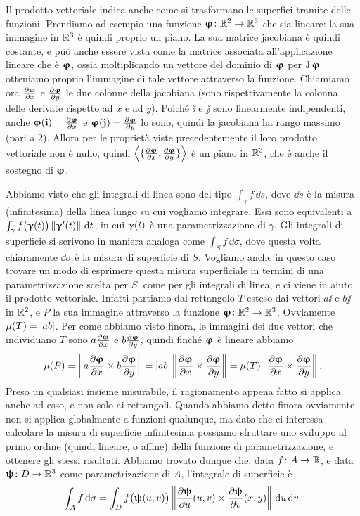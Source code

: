 Il prodotto vettoriale indica anche come si trasformano le superfici tramite delle funzioni.
Prendiamo ad esempio una funzione $\bm{\upvarphi}\colon\mathbb{R}^2\to\mathbb{R}^3$ che sia lineare: la sua immagine in $\mathbb{R}^3$ è quindi proprio un piano.
La sua matrice jacobiana è quindi costante, e può anche essere vista come la matrice associata all'applicazione lineare che è $\bm{\upvarphi}$, ossia moltiplicando un vettore del dominio di $\bm{\upvarphi}$ per $\operatorname{J}{\bm{\upvarphi}}$ otteniamo proprio l'immagine di tale vettore attraverso la funzione.
Chiamiamo ora $\frac{\partial {\bm{\upvarphi}}}{\partial {x}}$ e $\frac{\partial {\bm{\upvarphi}}}{\partial {y}}$ le due colonne della jacobiana (sono rispettivamente la colonna delle derivate rispetto ad $x$ e ad $y$).
Poich\'e $\ii$ e $\jj$ sono linearmente indipendenti, anche $\vphi(\ii)=\drp{\vphi}{x}$ e $\vphi(\jj)=\drp{\vphi}{y}$ lo sono, quindi la jacobiana ha rango massimo (pari a 2).
Allora per le proprietà viste precedentemente il loro prodotto vettoriale non è nullo, quindi $\left\langle{\{\frac{\partial {\bm{\upvarphi}}}{\partial {x}},\frac{\partial {\bm{\upvarphi}}}{\partial {y}}\}}\right\rangle$ è un piano in $\mathbb{R}^3$, che è anche il sostegno di $\bm{\upvarphi}$.

Abbiamo visto che gli integrali di linea sono del tipo $\int_\gamma f\,\dd s$, dove $\dd s$ è la misura (infinitesima) della linea lungo su cui vogliamo integrare.
Essi sono equivalenti a $\int_\gamma f\big(\bm{\upgamma}(t)\big)\left\|{\bm{\upgamma}'(t)}\right\|\,\textup{d} t$, in cui $\bm{\upgamma}(t)$ è una parametrizzazione di $\gamma$.
Gli integrali di superficie si scrivono in maniera analoga come $\int_S f\,\dd\sigma$, dove questa volta chiaramente $\dd\sigma$ è la misura di superficie di $S$.
Vogliamo anche in questo caso trovare un modo di esprimere questa misura superficiale in termini di una parametrizzazione scelta per $S$, come per gli integrali di linea, e ci viene in aiuto il prodotto vettoriale.
Infatti partiamo dal rettangolo $T$ esteso dai vettori $a\ii$ e $b\jj$ in $\mathbb{R}^2$, e $P$ la sua immagine attraverso la funzione $\bm{\upvarphi}\colon\mathbb{R}^2\to\mathbb{R}^3$.
Ovviamente $\mu(T)=\left|{ab}\right|$.
Per come abbiamo visto finora, le immagini dei due vettori che individuano $T$ sono $a\frac{\partial {\bm{\upvarphi}}}{\partial {x}}$ e $b\frac{\partial {\bm{\upvarphi}}}{\partial {y}}$, quindi finch\'e $\bm{\upvarphi}$ è lineare abbiamo
\begin{equation*}
	\mu(P)=\left\|{a\frac{\partial {\bm{\upvarphi}}}{\partial {x}}\times b\frac{\partial {\bm{\upvarphi}}}{\partial {y}}}\right\|=\left|{ab}\right|\left\|{\frac{\partial {\bm{\upvarphi}}}{\partial {x}}\times\frac{\partial {\bm{\upvarphi}}}{\partial {y}}}\right\|=\mu(T)\left\|{\frac{\partial {\bm{\upvarphi}}}{\partial {x}}\times\frac{\partial {\bm{\upvarphi}}}{\partial {y}}}\right\|.
\end{equation*}
Preso un qualsiasi insieme misurabile, il ragionamento appena fatto si applica anche ad esso, e non solo ai rettangoli.
Quando abbiamo detto finora ovviamente non si applica globalmente a funzioni qualunque, ma dato che ci interessa calcolare la misura di superficie infinitesima possiamo sfruttare uno sviluppo al primo ordine (quindi lineare, o affine) della funzione di parametrizzazione, e ottenere gli stessi risultati.
Abbiamo trovato dunque che, data $f\colon A\to\mathbb{R}$, e data $\bm{\uppsi}\colon D\to\mathbb{R}^3$ come parametrizazione di $A$, l'integrale di superficie è
\begin{equation}
	\int_Af\,\textup{d}\sigma=\int_Df\big(\bm{\uppsi}(u,v)\big)\left\|{\frac{\partial {\bm{\uppsi}}}{\partial {u}}(u,v)\times\frac{\partial {\bm{\uppsi}}}{\partial {v}}(x,y)}\right\|\,\textup{d} u\,\textup{d} v.
\end{equation}

